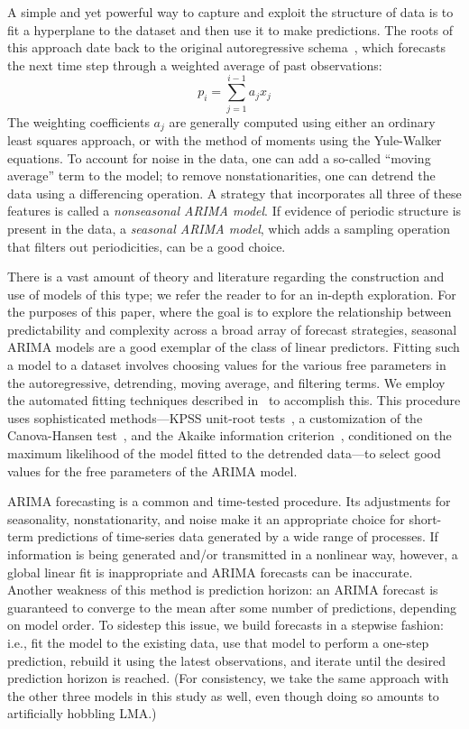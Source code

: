 A simple and yet powerful way to capture and exploit the structure of
data is to fit a hyperplane to the dataset and then use it to make
predictions.  The roots of this approach date back to the original
autoregressive schema~\cite{weigend93}, which forecasts the next time
step through a weighted average of past observations: $$p_i =
\sum_{j=1}^{i-1} a_j x_j$$ The weighting coefficients $a_j$ are
generally computed using either an ordinary least squares approach, or
with the method of moments using the Yule-Walker equations.  To
account for noise in the data, one can add a so-called ``moving
average'' term to the model; to remove nonstationarities, one can
detrend the data using a differencing operation.  A strategy that
incorporates all three of these features is called a \emph{nonseasonal
  ARIMA model}.  If evidence of periodic structure is present in the
data, a \emph{seasonal ARIMA model}, which adds a sampling operation
that filters out periodicities, can be a good choice.

There is a vast amount of theory and literature regarding the
construction and use of models of this type; we refer the reader to
\cite{davislinearts} for an in-depth exploration.  For the purposes of
this paper, where the goal is to explore the relationship between
predictability and complexity across a broad array of forecast
strategies, seasonal ARIMA models are a good exemplar of the class of
linear predictors.  Fitting such a model to a dataset involves
choosing values for the various free parameters in the autoregressive,
detrending, moving average, and filtering terms.  We employ the
automated fitting techniques described in~\cite{autoARIMA} to
accomplish this.  This procedure uses sophisticated methods---KPSS
unit-root tests~\cite{KPSSunit}, a customization of the Canova-Hansen
test~\cite{Canova1995}, and the Akaike information
criterion~\cite{akaike1974}, conditioned on the maximum likelihood
of the model fitted to the detrended data---to select good values for
the free parameters of the ARIMA model.

ARIMA forecasting is a common and time-tested procedure.  Its
adjustments for seasonality, nonstationarity, and noise make it an
appropriate choice for short-term predictions of time-series data
generated by a wide range of processes.  If information is being
generated and/or transmitted in a nonlinear way, however, a global
linear fit is inappropriate and ARIMA forecasts can be inaccurate.
Another weakness of this method is prediction horizon: an ARIMA
forecast is guaranteed to converge to the mean after some number of
predictions, depending on model order.  To sidestep this issue, we
build forecasts in a stepwise fashion: i.e., fit the model to the
existing data, use that model to perform a one-step prediction, rebuild it
using the latest observations, and iterate until the desired
prediction horizon is reached.  (For consistency, we take the same
approach with the other three models in this study as well, even
though doing so amounts to artificially hobbling LMA.)

